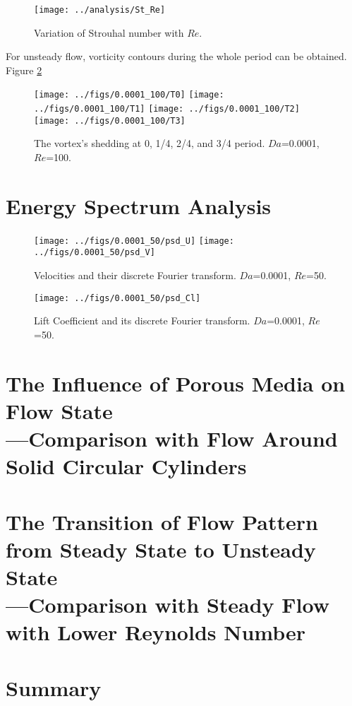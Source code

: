 \begin{figure}
	\centering
	\texttt{[image: ../analysis/St\_Re]}
	\caption{Variation of Strouhal number with $Re$.}
	\label{fig: St}
\end{figure}

For unsteady flow, vorticity contours during the whole period can be obtained. Figure \ref{fig: 4*vortex}
\begin{figure}[h]
	\centering
	{\texttt{[image: ../figs/0.0001\_100/T0]}}
	{\texttt{[image: ../figs/0.0001\_100/T1]}}
	{\texttt{[image: ../figs/0.0001\_100/T2]}}
	{\texttt{[image: ../figs/0.0001\_100/T3]}}
	\caption{The vortex's shedding at 0, 1/4, 2/4, and 3/4 period.
		$Da$=0.0001, $Re$=100.}
	\label{fig: 4*vortex}
\end{figure}


\section{Energy Spectrum Analysis} %
\begin{figure}[h]
	\centering
	\texttt{[image: ../figs/0.0001\_50/psd\_U]}
	\texttt{[image: ../figs/0.0001\_50/psd\_V]}
	\caption{Velocities and their discrete Fourier transform. $Da$=0.0001, $Re$=50.}
\end{figure}
\begin{figure}[h]
	\centering
	\texttt{[image: ../figs/0.0001\_50/psd\_Cl]}
	\caption{Lift Coefficient and its discrete Fourier transform. $Da$=0.0001, $Re$=50.}
\end{figure}


\section{The Influence of Porous Media on Flow State\\
	---Comparison with Flow Around Solid Circular Cylinders}
\section{The Transition of Flow Pattern from Steady State to Unsteady State\\
	---Comparison with Steady Flow with Lower Reynolds Number}
\section{Summary}
